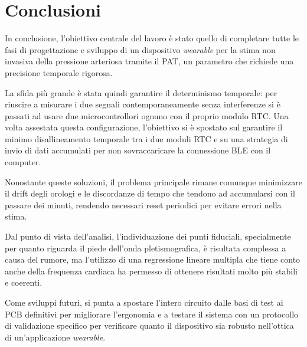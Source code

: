\documentclass[11pt,a4paper]{article}
\begin{document}
\section{Conclusioni}
\color{black}
In conclusione, l'obiettivo centrale del lavoro è stato quello di completare tutte le fasi di progettazione e sviluppo di un dispositivo \textit{wearable} per la stima non invasiva della pressione arteriosa tramite il PAT, un parametro che richiede una precisione temporale rigorosa.


La sfida più grande è stata quindi garantire il determinismo temporale: per riuscire a misurare i due segnali contemporaneamente senza interferenze si è passati ad usare due microcontrollori ognuno con il proprio modulo RTC. 
Una volta assestata questa configurazione, l'obiettivo si è spostato sul garantire il minimo disallineamento temporale tra i due moduli RTC e su una strategia di invio di dati accumulati per non sovraccaricare la connessione BLE con il computer.


Nonostante queste soluzioni, il problema principale rimane comunque minimizzare il drift degli orologi e le discordanze di tempo che tendono ad accumularsi con il passare dei minuti, rendendo necessari reset periodici per evitare errori nella stima.

Dal punto di vista dell’analisi, l’individuazione dei punti fiduciali, specialmente per quanto riguarda il piede dell'onda pletismografica, è risultata complessa a causa del rumore, ma l'utilizzo di una regressione lineare multipla che tiene conto anche della frequenza cardiaca ha permesso di ottenere risultati molto più stabili e coerenti.

Come sviluppi futuri, si punta a spostare l'intero circuito dalle basi di test ai PCB definitivi per migliorare l'ergonomia e a testare il sistema con un protocollo di validazione specifico per verificare quanto il dispositivo sia robusto nell'ottica di un'applicazione \textit{wearable}.

\cleardoublepage

\end{document}
